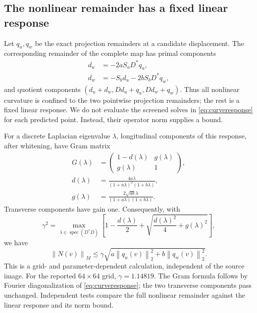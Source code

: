 \documentclass[journal]{IEEEtran}
\theoremstyle{definition}
\newcommand{\norm}[1]{\left\lVert#1\right\rVert}
\begin{document}
\subsection{The nonlinear remainder has a fixed linear response}
Let $q_u,q_w$ be the exact projection remainders at a candidate displacement.
The corresponding remainder of the complete map has primal components
\begin{align}
 d_u&=-2aS_aD^*q_u,\nonumber\\
 d_w&=-S_b d_u-2bS_bD^*q_w,
 \label{eq:curveresponse}
\end{align}
and quotient components
$(d_u+d_w,Dd_u+q_u,Dd_w+q_w)$. Thus all nonlinear curvature is confined
to the two pointwise projection remainders; the rest is a fixed linear
response. We do not evaluate the screened solves in \eqref{eq:curveresponse}
for each predicted point. Instead, their operator norm supplies a bound.

For a discrete Laplacian eigenvalue $\lambda$, longitudinal components of
this response, after whitening, have Gram matrix
\begin{align*}
 G(\lambda)&=\begin{pmatrix}1-d(\lambda)&g(\lambda)\\g(\lambda)&1\end{pmatrix},\\
 d(\lambda)&=\frac{4a\lambda}{(1+a\lambda)^2(1+b\lambda)},\\
 g(\lambda)&=\frac{2\sqrt{ab}\lambda}{(1+a\lambda)(1+b\lambda)}.
\end{align*}
Transverse components have gain one. Consequently, with
\begin{equation}
 \gamma^2=\max_{\lambda\in\operatorname{spec}(D^*D)}
 \left[1-\frac{d(\lambda)}2+
 \sqrt{\frac{d(\lambda)^2}4+g(\lambda)^2}\right], \label{eq:curvegain}
\end{equation}
we have
\begin{equation}
 \norm{N(v)}_M\leq
 \gamma\sqrt{a\norm{q_u(v)}_2^2+b\norm{q_w(v)}_2^2}.
 \label{eq:curvebound}
\end{equation}
This is a grid- and parameter-dependent calculation, independent of the
source image. For the reported $64\times64$ grid, $\gamma=1.14819$.
The Gram formula follows by Fourier diagonalization of
\eqref{eq:curveresponse}; the two transverse components pass unchanged.
Independent tests compare the full nonlinear remainder against the linear
response and its norm bound.
\end{document}
